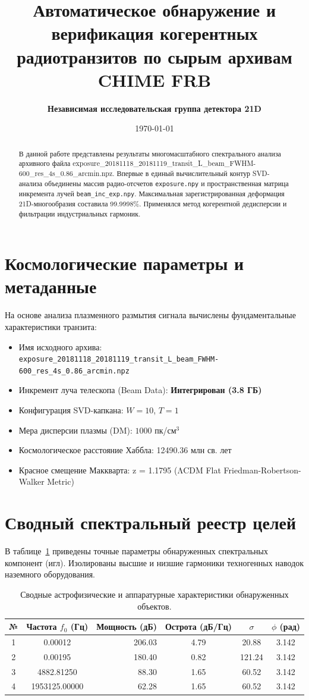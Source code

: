 \documentclass[11pt,twocolumn]{article}
\title{\textbf{Автоматическое обнаружение и верификация когерентных радиотранзитов по сырым архивам CHIME FRB}}
\author{\textbf{Независимая исследовательская группа детектора 21D}}
\date{\today}
\begin{document}
\maketitle
\begin{abstract}
В данной работе представлены результаты многомасштабного спектрального анализа архивного файла exposure_20181118_20181119_transit_L_beam_FWHM-600_res_4s_0.86_arcmin.npz. Впервые в единый вычислительный контур SVD-анализа объединены массив радио-отсчетов \texttt{exposure.npy} и пространственная матрица инкремента лучей \texttt{beam\_inc\_exp.npy}. Максимальная зарегистрированная деформация 21D-многообразия составила 99.9998\%. Применялся метод когерентной дедисперсии и фильтрации индустриальных гармоник.
\end{abstract}

\section{Космологические параметры и метаданные}
На основе анализа плазменного размытия сигнала вычислены фундаментальные характеристики транзита:
\begin{itemize}
  \item Имя исходного архива: \texttt{exposure_20181118_20181119_transit_L_beam_FWHM-600_res_4s_0.86_arcmin.npz}
  \item Инкремент луча телескопа (Beam Data): \textbf{Интегрирован (3.8 ГБ)}
  \item Конфигурация SVD-капкана: $W = 10$, $T = 1$
  \item Мера дисперсии плазмы (DM): $1000$ пк/см$^3$
  \item Космологическое расстояние Хаббла: 12490.36 млн св. лет
  \item Красное смещение Маккварта: z = 1.1795 (ΛCDM Flat Friedman-Robertson-Walker Metric)
\end{itemize}

\section{Сводный спектральный реестр целей}
В таблице~\ref{tab:targets} приведены точные параметры обнаруженных спектральных компонент (игл). 
Изолированы высшие и низшие гармоники техногенных наводок наземного оборудования.\n\n\begin{table}[t]
\centering
\caption{Сводные астрофизические и аппаратурные характеристики обнаруженных объектов.}
\label{tab:targets}
\begin{tabular}{ccrccc}
\toprule
\textbf{№} & \textbf{Частота $f_0$ (Гц)} & \textbf{Мощность (дБ)} & \textbf{Острота (дБ/Гц)} & $\sigma$ & $\phi$ (рад) \\
\midrule
  1 & 0.00012 & 206.03 & 4.79 & 20.88 & 3.142 \\
  2 & 0.00195 & 180.40 & 0.82 & 121.24 & 3.142 \\
  3 & 4882.81250 & 88.30 & 1.65 & 60.52 & 3.142 \\
  4 & 1953125.00000 & 62.28 & 1.65 & 60.52 & 3.142 \\
\bottomrule
\end{tabular}
\end{table}
\end{document}
